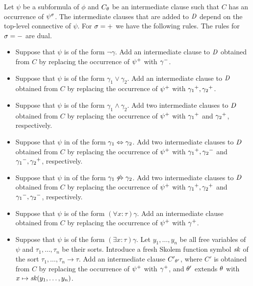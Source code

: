 Let $\psi$ be a subformula of $\phi$ and ${C}_{\theta}$ be an intermediate clause such that $C$ has an occurrence of ${\psi}^{\sigma}$. The intermediate clauses that are added to $\mathit{D}$ depend on the top-level connective of $\psi$. For $\sigma = +$ we have the following rules. The rules for $\sigma = -$ are dual.
\begin{itemize}
\item
	Suppose that $\psi$ is of the form $\neg \gamma$. Add an intermediate clause to $\mathit{D}$ obtained from $C$ by replacing the occurrence of ${\psi}^{+}$ with ${\gamma}^{-}$.

\item
	Suppose that $\psi$ is of the form $\gamma_1 \lor \gamma_2$. Add an intermediate clause to $\mathit{D}$ obtained from $C$ by replacing the occurrence of ${\psi}^{+}$ with ${\gamma_1}^{+}, {\gamma_2}^{+}$.
	
\item
	Suppose that $\psi$ is of the form $\gamma_1 \land \gamma_2$. Add two intermediate clauses to $\mathit{D}$ obtained from $C$ by replacing the occurrence of ${\psi}^{+}$ with ${\gamma_1}^{+}$ and ${\gamma_2}^{+}$, respectively.

\item
	Suppose that $\psi$ in of the form $\gamma_1 \Leftrightarrow \gamma_2$. Add two intermediate clauses to $\mathit{D}$ obtained from $C$ by replacing the occurrence of ${\psi}^{+}$ with ${\gamma_1}^{+}, {\gamma_2}^{-}$ and ${\gamma_1}^{-}, {\gamma_2}^{+}$, respectively.

\item
	Suppose that $\psi$ in of the form $\gamma_1 \not\Leftrightarrow \gamma_2$. Add two intermediate clauses to $\mathit{D}$ obtained from $C$ by replacing the occurrence of ${\psi}^{+}$ with ${\gamma_1}^{+}, {\gamma_2}^{+}$ and ${\gamma_1}^{-}, {\gamma_2}^{-}$, respectively.

\item
	Suppose that $\psi$ is of the form $(\forall x:\tau)\gamma$. Add an intermediate clause obtained from $C$ by replacing the occurrence of ${\psi}^{+}$ with ${\gamma}^{+}$.

\item
	Suppose that $\psi$ is of the form $(\exists x:\tau)\gamma$. Let $y_1,\ldots,y_n$ be all free variables of $\psi$ and $\tau_1,\ldots,\tau_n$ be their sorts. Introduce a fresh Skolem function symbol $\mathit{sk}$ of the sort $\tau_1,\ldots,\tau_n\to\tau$. Add an intermediate clause ${C'}_{\theta'}$, where $C'$ is obtained from $C$ by replacing the occurrence of ${\psi}^{+}$ with ${\gamma}^{+}$, and $\theta'$ extends $\theta$ with $x \mapsto \mathit{sk}(y_1,\ldots,y_n)$.
\end{itemize}

